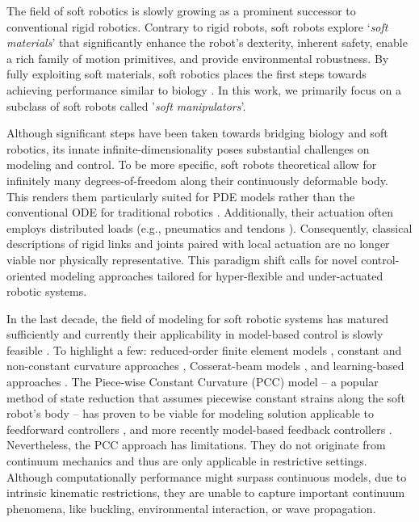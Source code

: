 The field of soft robotics is slowly growing as a prominent successor to conventional rigid robotics. Contrary to rigid robots, soft robots explore `\textit{soft materials}' that significantly enhance the robot's dexterity, inherent safety, enable a rich family of motion primitives, and provide environmental robustness. By fully exploiting soft materials, soft robotics places the first steps towards achieving performance similar to biology \cite{Choi2011,Falkenhahn2015,Marchese2014}. In this work, we primarily focus on a subclass of soft robots called '\textit{soft manipulators}'.

Although significant steps have been taken towards bridging biology and soft robotics, its innate infinite-dimensionality poses substantial challenges on modeling and control. To be more specific, soft robots theoretical allow for infinitely many degrees-of-freedom along their continuously deformable body. This renders them particularly suited for PDE models \cite{Duriez2013,Largilliere2015,Wu2021} rather than the conventional ODE for traditional robotics \cite{Spong2006,Murray1994}. Additionally, their actuation often employs distributed loads (e.g., pneumatics \cite{Falkenhahn2015,Marchese2014} and tendons \cite{Till2019,Wu2021}). Consequently, classical descriptions of rigid links and joints paired with local actuation are no longer viable nor physically representative. This paradigm shift calls for novel control-oriented modeling approaches tailored for hyper-flexible and under-actuated robotic systems.

In the last decade, the field of modeling for soft robotic systems has matured sufficiently and currently their applicability in model-based control is slowly feasible \cite{DellaSantina2021}. To highlight a few: reduced-order finite element models \cite{Duriez2013,Zhang2017,Wu2021}, constant and non-constant curvature approaches \cite{Katzschmann2019,Santina2020}, Cosserat-beam models \cite{Renda2020,Boyer2021}, and learning-based approaches \cite{Bruder2019}. The Piece-wise Constant Curvature (PCC) model -- a popular method of state reduction that assumes piecewise constant strains along the soft robot's body -- has proven to be viable for modeling solution applicable to feedforward controllers \cite{Falkenhahn2015}, and more recently model-based feedback controllers \cite{Santina2020,Katzschmann2019}. Nevertheless, the PCC approach has limitations. They do not originate from continuum mechanics and thus are only applicable in restrictive settings. Although computationally performance might surpass continuous models, due to intrinsic kinematic restrictions, they are unable to capture important continuum phenomena, like buckling, environmental interaction, or wave propagation.

